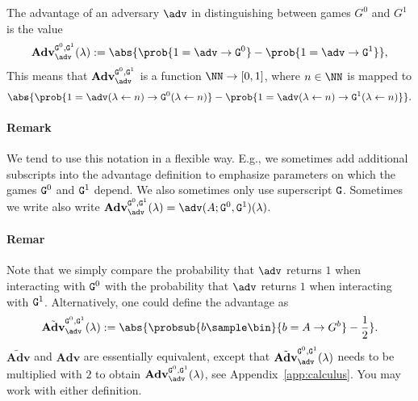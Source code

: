 \begin{definition}[Advantage]
	The advantage of an adversary $\adv$ in distinguishing between games $G^0$ and $G^1$ is the value
	\[{\mathbf{Adv}}_{\adv}^{\M{G}^0,\M{G}^1}(\lambda) := \abs{\prob{1=\adv \circ \M{G}^0} - \prob{1 = \adv \circ \M{G}^1}},\]
	This means that ${\mathbf{Adv}}_{\adv}^{\M{G}^0,\M{G}^1}$ is a function $\NN\rightarrow [0,1]$, where $n\in\NN$ is mapped to
	\begin{equation}\label{defeq:advantage}
		\abs{\prob{1=\adv(\lambda\gets n) \circ \M{G}^0(\lambda\gets n)} - \prob{1 = \adv(\lambda\gets n) \circ \M{G}^1(\lambda\gets n)}}.
	\end{equation}
\end{definition}
\paragraph{Remark} We tend to use this notation in a flexible way. E.g., we sometimes add additional subscripts into the advantage definition to emphasize parameters on which the games $\text{\texttt{G}}^0$ and  $\text{\texttt{G}}^1$ depend. We also sometimes only use superscript $\text{\texttt{G}}$. Sometimes we write also write ${\mathbf{Adv}}_{\adv}^{\M{G}^0,\M{G}^1}(\lambda) = \adv(A; \M{G}^0, \M{G}^1)(\lambda)$.
\paragraph{Remar} Note that we simply compare the probability that $\adv$ returns $1$ when interacting with $\text{\texttt{G}}^0$ with the probability that $\adv$ returns $1$ when interacting with $\text{\texttt{G}}^1$. Alternatively, one could define the advantage as
\[\tilde{\textbf{Adv}}_{\adv}^{\M{G}^0,\M{G}^1}(\lambda):=\abs{\probsub{b\sample\bin}{b = A \circ G^b} - \frac{1}{2}}.\]
$\tilde{\textbf{Adv}}$ and $\textbf{Adv}$ are essentially equivalent, except that $\tilde{\textbf{Adv}}^{\M{G}^0,\M{G}^1}_{\adv}(\lambda)$ needs to be multiplied with $2$ to obtain $\textbf{Adv}^{\M{G}^0,\M{G}^1}_{\adv}(\lambda)$, see Appendix~\ref{app:calculus}. You may work with either definition.


